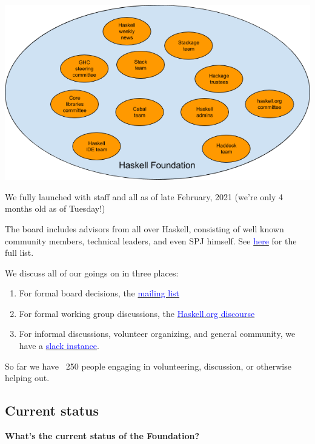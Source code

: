 \documentclass[tikz]{beamer}
\newcommand{\blue}[1]{\textcolor{blue}{#1}}
\theoremstyle{definition}
\begin{document}
\frame
{ 
	\begin{center}
		\includegraphics[scale=0.4]{community-glue.png}
	\end{center}

} 
\frame
{ 
	We fully launched with staff and all as of late February, 2021 (we're only 4 months old as of Tuesday!)
} 

\frame
{ 
	The board includes advisors from all over Haskell, consisting of well known community members, technical leaders, and even SPJ himself. See \href{https://haskell.foundation/who-we-are}{\blue{here}} for the full list. 
} 

\frame
{
	We discuss all of our goings on in three places: 
	
	\begin{enumerate}
		\item For formal board decisions, the \href{https://groups.google.com/u/2/a/haskell.foundation/g/board}{\blue{mailing list}}
		\item For formal working group discussions, the \href{https://discourse.haskell.org/c/haskell-foundation/11}{\blue{Haskell.org discourse}}
		\item For informal discussions, volunteer organizing, and general community, we have a \href{https://join.slack.com/t/haskell-foundation/shared_invite/zt-mjh76fw0-CEjg2NbyVE8rVQDvR~0F4A}{\blue{slack instance}}. 
	\end{enumerate}
}

\frame
{ 
	So far we have ~250 people engaging in volunteering, discussion, or otherwise helping out. 
} 

\subsection{Current status}
\frame
{ 
	\textbf{What's the current status of the Foundation?} 
} 
\end{document}
